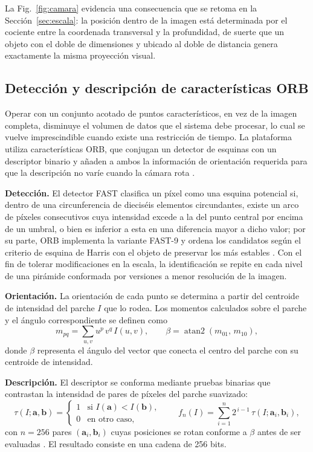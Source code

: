 La Fig.~\ref{fig:camara} evidencia una consecuencia que se retoma en la Sección~\ref{sec:escala}: la posición dentro de la imagen está determinada por el cociente entre la coordenada transversal y la profundidad, de suerte que un objeto con el doble de dimensiones y ubicado al doble de distancia genera exactamente la misma proyección visual.

\subsection{Detección y descripción de características ORB}

Operar con un conjunto acotado de puntos característicos, en vez de la imagen completa, disminuye el volumen de datos que el sistema debe procesar, lo cual se vuelve imprescindible cuando existe una restricción de tiempo.
La plataforma utiliza características ORB, que conjugan un detector de esquinas con un descriptor binario y añaden a ambos la información de orientación requerida para que la descripción no varíe cuando la cámara rota \cite{rublee2011orb}.

\textbf{Detección.}
El detector FAST \cite{rosten2006fast} clasifica un píxel como una esquina potencial si, dentro de una circunferencia de dieciséis elementos circundantes, existe un arco de píxeles consecutivos cuya intensidad excede a la del punto central por encima de un umbral, o bien es inferior a esta en una diferencia mayor a dicho valor; por su parte, ORB implementa la variante FAST-9 y ordena los candidatos según el criterio de esquina de Harris con el objeto de preservar los más estables \cite{rublee2011orb}.
Con el fin de tolerar modificaciones en la escala, la identificación se repite en cada nivel de una pirámide conformada por versiones a menor resolución de la imagen.


\textbf{Orientación.}
La orientación de cada punto se determina a partir del centroide de intensidad del parche $I$ que lo rodea.
Los momentos calculados sobre el parche y el ángulo correspondiente se definen como \cite{rublee2011orb}
\begin{equation}
m_{pq} = \sum_{u,v} u^{p}\, v^{q}\, I(u,v),
\qquad
\beta = \operatorname{atan2}(m_{01},\, m_{10}),
\label{eq:orb-orientacion}
\end{equation}
donde $\beta$ representa el ángulo del vector que conecta el centro del parche con su centroide de intensidad.


\textbf{Descripción.}
El descriptor se conforma mediante pruebas binarias que contrastan la intensidad de pares de píxeles del parche suavizado:
\begin{equation}
\tau(I;\mathbf{a},\mathbf{b}) =
\begin{cases}
1 & \text{si } I(\mathbf{a}) < I(\mathbf{b}),\\
0 & \text{en otro caso,}
\end{cases}
\qquad
f_n(I) = \sum_{i=1}^{n} 2^{\,i-1}\,\tau(I;\mathbf{a}_i,\mathbf{b}_i),
\label{eq:orb-descriptor}
\end{equation}
con $n=256$ pares $(\mathbf{a}_i,\mathbf{b}_i)$ cuyas posiciones se rotan conforme a $\beta$ antes de ser evaluadas \cite{rublee2011orb}.
El resultado consiste en una cadena de 256 bits.


